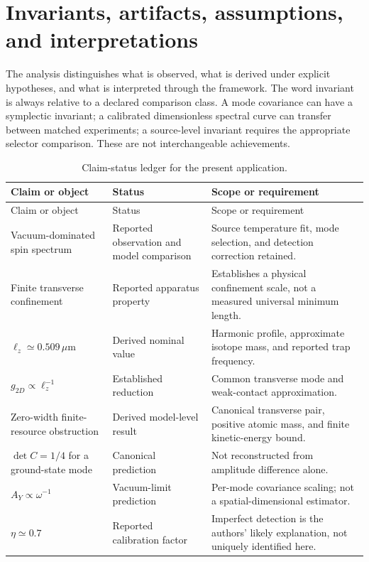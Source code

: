 \documentclass[11pt,a4paper]{article}
\theoremstyle{definition}
\theoremstyle{remark}
\newcommand{\lop}{\ell_z}
\begin{document}
\section{Invariants, artifacts, assumptions, and interpretations}
\label{sec:ledger}
The analysis distinguishes what is observed, what is derived under explicit hypotheses, and what is interpreted through the framework. The word invariant is always relative to a declared comparison class. A mode covariance can have a symplectic invariant; a calibrated dimensionless spectral curve can transfer between matched experiments; a source-level invariant requires the appropriate selector comparison. These are not interchangeable achievements.\cite{foundation}

\begin{longtable}{@{}L{0.25\textwidth}L{0.27\textwidth}L{0.40\textwidth}@{}}
\caption{Claim-status ledger for the present application.\label{tab:ledger}}\\
\toprule Claim or object & Status & Scope or requirement\\\midrule
\endfirsthead
\toprule Claim or object & Status & Scope or requirement\\\midrule
\endhead
\bottomrule\endfoot
Vacuum-dominated spin spectrum & Reported observation and model comparison & Source temperature fit, mode selection, and detection correction retained.\cite{zhang2026}\\
Finite transverse confinement & Reported apparatus property & Establishes a physical confinement scale, not a measured universal minimum length.\cite{zhang2026}\\
$\lop\simeq0.509\,\mu\mathrm m$ & Derived nominal value & Harmonic profile, approximate isotope mass, and reported trap frequency.\\
$g_{2D}\propto\lop^{-1}$ & Established reduction & Common transverse mode and weak-contact approximation.\cite{hadzibabic}\\
Zero-width finite-resource obstruction & Derived model-level result & Canonical transverse pair, positive atomic mass, and finite kinetic-energy bound.\\
$\det C=1/4$ for a ground-state mode & Canonical prediction & Not reconstructed from amplitude difference alone.\\
$A_Y\propto\omega^{-1}$ & Vacuum-limit prediction & Per-mode covariance scaling; not a spatial-dimensional estimator.\\
$\eta\simeq0.7$ & Reported calibration factor & Imperfect detection is the authors' likely explanation, not uniquely identified here.\cite{zhang2026}\\

\end{longtable}
\end{document}
